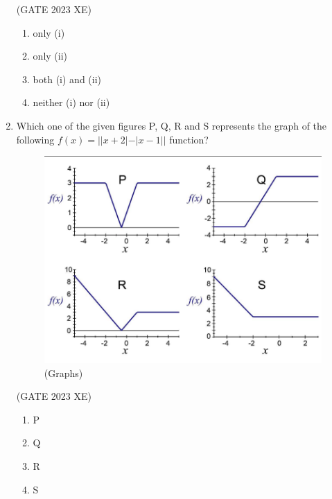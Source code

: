 \documentclass[journal,12pt,onecolumn]{IEEEtran}
\begin{document}
\begin{enumerate}
\hfill{(GATE 2023 XE)}

\begin{multicols}{2}

\begin{enumerate}

\item only (i)

\item only (ii)

\item both (i) and (ii)

\item neither (i) nor (ii)

\end{enumerate}

\end{multicols}

\newpage
\item Which one of the given figures P, Q, R and S represents the graph of the following $f(x) = ||x+2| - |x-1||$ function? 


\begin{figure}[htbp]

\centering

\includegraphics[width=.4\columnwidth]{figs/GA/fig2.png}

\caption{(Graphs)}

\label{fig:figs/GA/fig2.png}

\end{figure}

\hfill{(GATE 2023 XE)}

\begin{multicols}{4}

\begin{enumerate}

\item P

\item Q

\item R

\item S

\end{enumerate}


\end{multicols}
\end{enumerate}
\end{document}
